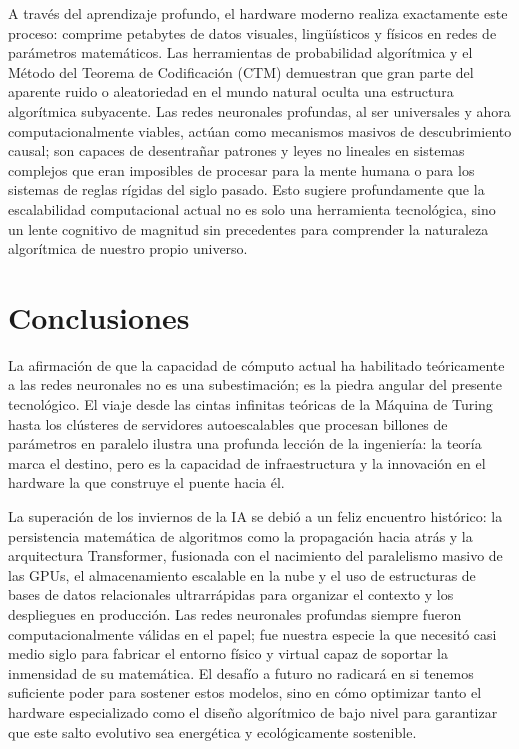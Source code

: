\documentclass[12pt,a4paper]{article}
\begin{document}
A través del aprendizaje profundo, el hardware moderno realiza exactamente este proceso: comprime petabytes de datos visuales, lingüísticos y físicos en redes de parámetros matemáticos. Las herramientas de probabilidad algorítmica y el Método del Teorema de Codificación (CTM) demuestran que gran parte del aparente ruido o aleatoriedad en el mundo natural oculta una estructura algorítmica subyacente\cite{zenil2021}. Las redes neuronales profundas, al ser universales y ahora computacionalmente viables, actúan como mecanismos masivos de descubrimiento causal; son capaces de desentrañar patrones y leyes no lineales en sistemas complejos que eran imposibles de procesar para la mente humana o para los sistemas de reglas rígidas del siglo pasado\cite{zenil2021}. Esto sugiere profundamente que la escalabilidad computacional actual no es solo una herramienta tecnológica, sino un lente cognitivo de magnitud sin precedentes para comprender la naturaleza algorítmica de nuestro propio universo\cite{zenil2021}.

\section{Conclusiones}
La afirmación de que la capacidad de cómputo actual ha habilitado teóricamente a las redes neuronales no es una subestimación; es la piedra angular del presente tecnológico. El viaje desde las cintas infinitas teóricas de la Máquina de Turing hasta los clústeres de servidores autoescalables que procesan billones de parámetros en paralelo ilustra una profunda lección de la ingeniería: la teoría marca el destino, pero es la capacidad de infraestructura y la innovación en el hardware la que construye el puente hacia él.

La superación de los inviernos de la IA se debió a un feliz encuentro histórico: la persistencia matemática de algoritmos como la propagación hacia atrás y la arquitectura Transformer, fusionada con el nacimiento del paralelismo masivo de las GPUs, el almacenamiento escalable en la nube y el uso de estructuras de bases de datos relacionales ultrarrápidas para organizar el contexto y los despliegues en producción. Las redes neuronales profundas siempre fueron computacionalmente válidas en el papel; fue nuestra especie la que necesitó casi medio siglo para fabricar el entorno físico y virtual capaz de soportar la inmensidad de su matemática. El desafío a futuro no radicará en si tenemos suficiente poder para sostener estos modelos, sino en cómo optimizar tanto el hardware especializado como el diseño algorítmico de bajo nivel para garantizar que este salto evolutivo sea energética y ecológicamente sostenible.
\end{document}

